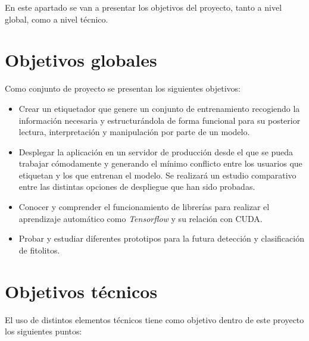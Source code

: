 En este apartado se van a presentar los objetivos del proyecto, tanto a nivel global, como a nivel técnico.
\section{Objetivos globales}

Como conjunto de proyecto se presentan los siguientes objetivos:

\begin{itemize}
	\item Crear un etiquetador que genere un conjunto de entrenamiento recogiendo la información necesaria y estructurándola de forma funcional para su posterior lectura, interpretación y manipulación por parte de un modelo.
	
	\item Desplegar la aplicación en un servidor de producción desde el que se pueda trabajar cómodamente y generando el mínimo conflicto entre los usuarios que etiquetan y los que entrenan el modelo. Se realizará un estudio comparativo entre las distintas opciones de despliegue que han sido probadas.
	
	\item Conocer y comprender el funcionamiento de librerías para realizar el aprendizaje automático como \textit{Tensorflow} y su relación con CUDA.
	
	\item Probar y estudiar diferentes prototipos para la futura detección y clasificación de fitolitos.
\end{itemize}

\section{Objetivos técnicos}

El uso de distintos elementos técnicos tiene como objetivo dentro de este proyecto los siguientes puntos:

